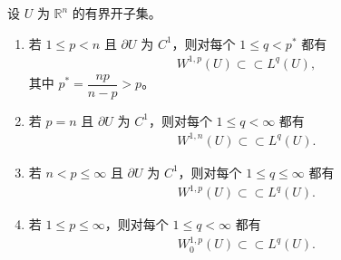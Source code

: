 \documentclass[../../main.tex]{subfiles}
\begin{document}
\begin{theorem}\label{theorem:Rellich--Kondrachov紧性定理}
设 $U$ 为 $\mathbb{R}^{n}$ 的有界开子集。
\begin{enumerate}[(1)]
\item 若 $1\leqslant p<n$ 且 $\partial U$ 为 $C^{1}$，则对每个 $1\leqslant q<p^{*}$ 都有
\begin{align*}
W^{1,p}(U)\subset \subset L^{q}(U),
\end{align*}
其中 $p^{*}=\dfrac{np}{n-p}>p$。
\item 若 $p=n$ 且 $\partial U$ 为 $C^{1}$，则对每个 $1\leqslant q<\infty$ 都有
\begin{align*}
W^{1,n}(U)\subset \subset L^{q}(U).
\end{align*}
\item 若 $n<p\leqslant\infty$ 且 $\partial U$ 为 $C^{1}$，则对每个 $1\leqslant q\leqslant\infty$ 都有
\begin{align*}
W^{1,p}(U)\subset \subset L^{q}(U).
\end{align*}
\item 若 $1\leqslant p\leqslant\infty$，则对每个 $1\leqslant q<\infty$ 都有
\begin{align*}
W_{0}^{1,p}(U)\subset \subset L^{q}(U).
\end{align*}
\end{enumerate}
\end{theorem}
\end{document}
